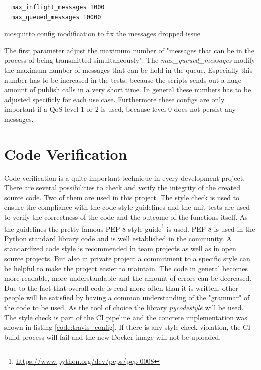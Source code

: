 \begin{listing}[H]
  \begin{verbatim}
  max_inflight_messages 1000
  max_queued_messages 10000
  \end{verbatim}
  \caption[mosquitto config modification to fix the messages dropped issue]{mosquitto config modification to fix the messages dropped issue}
  \label{code:performance_mosquitto_config}
\end{listing}

The first parameter adjust the maximum number of "messages that can be in the process of being transmitted simultaneously"\autocite{Mosquitto:Conf:Documentation}.
The \textit{max\_queued\_messages} modify the maximum number of messages that can be hold in the queue.\autocite[cf.]{Mosquitto:Conf:Documentation}
Especially this number has to be increased in the tests, because the scripts sends out a huge amount of publish calls in a very short time.
In general these numbers has to be adjusted specificly for each use case.
Furthermore these configs are only important if a \ac{QoS} level 1 or 2 is used, because level 0 does not persist any messages.


\section{Code Verification}
\label{section:code-verification}
Code verification is a quite important technique in every development project.
There are several possibilities to check and verify the integrity of the created source code.
Two of them are used in this project.
The style check is used to ensure the compliance with the code style guidelines and the unit tests are used to verify the correctness of the code and the outcome of the functions itself.
As the guidelines the pretty famous \ac{PEP} 8 style guide\footnote{\url{https://www.python.org/dev/peps/pep-0008}} is used.
\ac{PEP} 8 is used in the Python standard library code and is well established in the community.
A standardized code style is recommended in team projects as well as in open source projects.
But also in private project a commitment to a specific style can be helpful to make the project easier to maintain.
The code in general becomes more readable, more understandable and the amount of errors can be decreased.
Due to the fact that overall code is read more often than it is written, other people will be satisfied by having a common understanding of the "grammar" of the code to be used.
As the tool of choice the library \textit{pycodestyle} will be used.
The style check is part of the \ac{CI} pipeline and the concrete implementation was shown in listing \ref{code:travis_config}.
If there is any style check violation, the \ac{CI} build process will fail and the new Docker image will not be uploaded.

